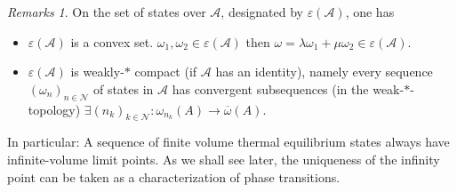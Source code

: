 \documentclass[
a4paper, %
11pt, %
onecolumn, %
openany, %
]{memoir}
\theoremstyle{definition}
\theoremstyle{remark}
\newtheorem{remarks}[definition]{Remarks}
\theoremstyle{plain}
\begin{document}
\begin{remarks}
	On the set of states over $\mathcal{A}$, designated by $\varepsilon(\mathcal{A})$, one has \begin{itemize}
		\item $\varepsilon(\mathcal{A})$ is a convex set. $\omega_1,\omega_2\in\varepsilon(\mathcal{A})$ then $\omega=\lambda\omega_1+\mu\omega_2\in\varepsilon(\mathcal{A})$.
		\item $\varepsilon(\mathcal{A})$ is weakly-$*$ compact (if $\mathcal{A}$ has an identity), namely every sequence $(\omega_n)_{n\in\mathcal{N}}$ of states in $\mathcal{A}$ has convergent subsequences (in the weak-$*$-topology) $\exists(n_k)_{k\in\mathcal{N}}:\omega_{n_k}(A)\rightarrow \overline{\omega}(A)$.
	\end{itemize}
In particular: A sequence of finite volume thermal equilibrium states always have infinite-volume limit points. As we shall see later, the uniqueness of the infinity point can be taken as a characterization of phase transitions.
\end{remarks}
\end{document}

